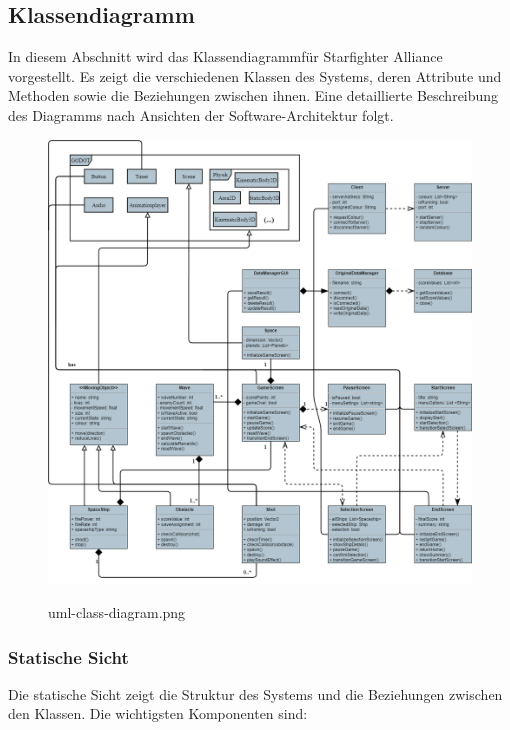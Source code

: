 \documentclass[10pt]{article}
\begin{document}
\newpage
	\subsection{Klassendiagramm}

In diesem Abschnitt wird das Klassendiagramm\footnotemark[4] für Starfighter Alliance vorgestellt. Es zeigt die verschiedenen Klassen des Systems, deren Attribute und Methoden sowie die Beziehungen zwischen ihnen. Eine detaillierte Beschreibung des Diagramms nach Ansichten der Software-Architektur folgt.


\begin{figure}
\centering
	\includegraphics[width=1\textwidth]{../../../images/Pflichtenheft_Assets/uml-class-diagram/uml-class-diagram.png}\\
	\caption{uml-class-diagram.png}
\end{figure}
\newpage
\subsubsection{Statische Sicht}

Die statische Sicht zeigt die Struktur des Systems und die Beziehungen zwischen den Klassen. Die wichtigsten Komponenten sind:
\end{document}
